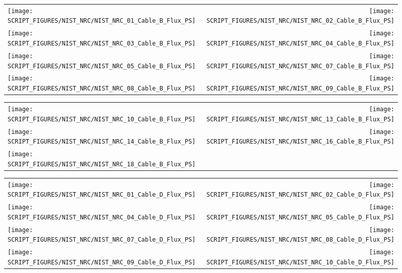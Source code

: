 \begin{figure}[p]
\begin{tabular*}{\textwidth}{l@{\extracolsep{\fill}}r}
\texttt{[image: SCRIPT\_FIGURES/NIST\_NRC/NIST\_NRC\_01\_Cable\_B\_Flux\_PS]} &
\texttt{[image: SCRIPT\_FIGURES/NIST\_NRC/NIST\_NRC\_02\_Cable\_B\_Flux\_PS]} \\
\texttt{[image: SCRIPT\_FIGURES/NIST\_NRC/NIST\_NRC\_03\_Cable\_B\_Flux\_PS]} &
\texttt{[image: SCRIPT\_FIGURES/NIST\_NRC/NIST\_NRC\_04\_Cable\_B\_Flux\_PS]} \\
\texttt{[image: SCRIPT\_FIGURES/NIST\_NRC/NIST\_NRC\_05\_Cable\_B\_Flux\_PS]} &
\texttt{[image: SCRIPT\_FIGURES/NIST\_NRC/NIST\_NRC\_07\_Cable\_B\_Flux\_PS]} \\
\texttt{[image: SCRIPT\_FIGURES/NIST\_NRC/NIST\_NRC\_08\_Cable\_B\_Flux\_PS]} &
\texttt{[image: SCRIPT\_FIGURES/NIST\_NRC/NIST\_NRC\_09\_Cable\_B\_Flux\_PS]}
\end{tabular*}
\end{figure}

\begin{figure}[p]
\begin{tabular*}{\textwidth}{l@{\extracolsep{\fill}}r}
\texttt{[image: SCRIPT\_FIGURES/NIST\_NRC/NIST\_NRC\_10\_Cable\_B\_Flux\_PS]} &
\texttt{[image: SCRIPT\_FIGURES/NIST\_NRC/NIST\_NRC\_13\_Cable\_B\_Flux\_PS]} \\
\texttt{[image: SCRIPT\_FIGURES/NIST\_NRC/NIST\_NRC\_14\_Cable\_B\_Flux\_PS]} &
\texttt{[image: SCRIPT\_FIGURES/NIST\_NRC/NIST\_NRC\_16\_Cable\_B\_Flux\_PS]} \\
\texttt{[image: SCRIPT\_FIGURES/NIST\_NRC/NIST\_NRC\_18\_Cable\_B\_Flux\_PS]}
\end{tabular*}
\end{figure}

\begin{figure}[p]
\begin{tabular*}{\textwidth}{l@{\extracolsep{\fill}}r}
\texttt{[image: SCRIPT\_FIGURES/NIST\_NRC/NIST\_NRC\_01\_Cable\_D\_Flux\_PS]} &
\texttt{[image: SCRIPT\_FIGURES/NIST\_NRC/NIST\_NRC\_02\_Cable\_D\_Flux\_PS]} \\
\texttt{[image: SCRIPT\_FIGURES/NIST\_NRC/NIST\_NRC\_04\_Cable\_D\_Flux\_PS]} &
\texttt{[image: SCRIPT\_FIGURES/NIST\_NRC/NIST\_NRC\_05\_Cable\_D\_Flux\_PS]} \\
\texttt{[image: SCRIPT\_FIGURES/NIST\_NRC/NIST\_NRC\_07\_Cable\_D\_Flux\_PS]} &
\texttt{[image: SCRIPT\_FIGURES/NIST\_NRC/NIST\_NRC\_08\_Cable\_D\_Flux\_PS]} \\
\texttt{[image: SCRIPT\_FIGURES/NIST\_NRC/NIST\_NRC\_09\_Cable\_D\_Flux\_PS]} &
\texttt{[image: SCRIPT\_FIGURES/NIST\_NRC/NIST\_NRC\_10\_Cable\_D\_Flux\_PS]}
\end{tabular*}
\end{figure}

